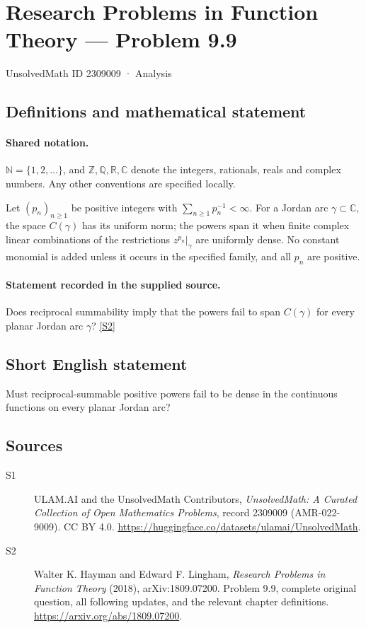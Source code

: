 \documentclass[11pt]{book}
\newcommand{\sref}[2]{\hyperlink{source:#1:#2}{[S#2]}}
\begin{document}
\setcounter{section}{2309008}
\section{Research Problems in Function Theory — Problem 9.9}\label{2309009}
{\small\sffamily UnsolvedMath ID 2309009 · Analysis}
\subsection{Definitions and mathematical statement}

\paragraph{Shared notation.}$\mathbb N=\{1,2,\ldots\}$, and $\mathbb Z,\mathbb Q,\mathbb R,\mathbb C$ denote the integers, rationals, reals and complex numbers. Any other conventions are specified locally.


Let $(p_n)_{n\ge1}$ be positive integers with $\sum_{n\ge1}p_n^{-1}<\infty$. For a Jordan arc $\gamma\subset\mathbb C$, the space $C(\gamma)$ has its uniform norm; the powers span it when finite complex linear combinations of the restrictions $z^{p_n}|_\gamma$ are uniformly dense. No constant monomial is added unless it occurs in the specified family, and all $p_n$ are positive.
\paragraph{Statement recorded in the supplied source.}
Does reciprocal summability imply that the powers fail to span $C(\gamma)$ for every planar Jordan arc $\gamma$? \sref{2309009}{2}
\subsection{Short English statement}
Must reciprocal-summable positive powers fail to be dense in the continuous functions on every planar Jordan arc?
\subsection{Sources}
\begin{description}
\item[\hypertarget{source:2309009:1}{S1}] ULAM.AI and the UnsolvedMath Contributors, \emph{UnsolvedMath: A Curated Collection of Open Mathematics Problems}, record 2309009 (AMR-022-9009). CC BY 4.0. \url{https://huggingface.co/datasets/ulamai/UnsolvedMath}.
\item[\hypertarget{source:2309009:2}{S2}] Walter K. Hayman and Edward F. Lingham, \emph{Research Problems in Function Theory} (2018), arXiv:1809.07200. Problem 9.9, complete original question, all following updates, and the relevant chapter definitions. \url{https://arxiv.org/abs/1809.07200}.
\end{description}
\label{end:2309009}
\end{document}
